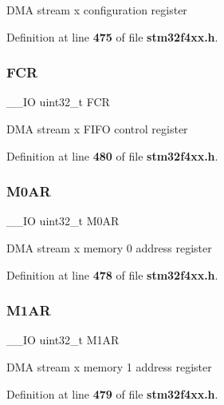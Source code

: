 D\+MA stream x configuration register 

Definition at line \textbf{ 475} of file \textbf{ stm32f4xx.\+h}.

\mbox{\label{structDMA__Stream__TypeDef_a5d5cc7f32884945503dd29f8f6cbb415}} 
\subsubsection{F\+CR}
{\footnotesize\ttfamily \+\_\+\+\_\+\+IO uint32\+\_\+t F\+CR}

D\+MA stream x F\+I\+FO control register 

Definition at line \textbf{ 480} of file \textbf{ stm32f4xx.\+h}.

\mbox{\label{structDMA__Stream__TypeDef_a63b4d166f4ab5024db6b493a7ab7b640}} 
\subsubsection{M0\+AR}
{\footnotesize\ttfamily \+\_\+\+\_\+\+IO uint32\+\_\+t M0\+AR}

D\+MA stream x memory 0 address register 

Definition at line \textbf{ 478} of file \textbf{ stm32f4xx.\+h}.

\mbox{\label{structDMA__Stream__TypeDef_aee7782244ceb4791d9a3891804ac47ac}} 
\subsubsection{M1\+AR}
{\footnotesize\ttfamily \+\_\+\+\_\+\+IO uint32\+\_\+t M1\+AR}

D\+MA stream x memory 1 address register 

Definition at line \textbf{ 479} of file \textbf{ stm32f4xx.\+h}.

\mbox{\label{structDMA__Stream__TypeDef_af60258ad5a25addc1e8969665d0c1731}} 
